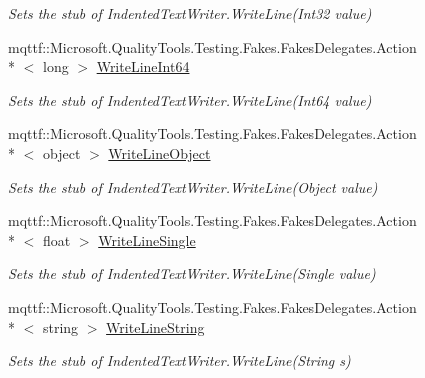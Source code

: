 \begin{DoxyCompactItemize}
\begin{DoxyCompactList}\small\item\em Sets the stub of Indented\-Text\-Writer.\-Write\-Line(\-Int32 value)\end{DoxyCompactList}\item 
mqttf\-::\-Microsoft.\-Quality\-Tools.\-Testing.\-Fakes.\-Fakes\-Delegates.\-Action\\*
$<$ long $>$ \hyperlink{class_system_1_1_code_dom_1_1_compiler_1_1_fakes_1_1_stub_indented_text_writer_a657b45c192824363dae987dbcbf330af}{Write\-Line\-Int64}
\begin{DoxyCompactList}\small\item\em Sets the stub of Indented\-Text\-Writer.\-Write\-Line(\-Int64 value)\end{DoxyCompactList}\item 
mqttf\-::\-Microsoft.\-Quality\-Tools.\-Testing.\-Fakes.\-Fakes\-Delegates.\-Action\\*
$<$ object $>$ \hyperlink{class_system_1_1_code_dom_1_1_compiler_1_1_fakes_1_1_stub_indented_text_writer_acd9414bf46444087c28ae18b21f4f0a5}{Write\-Line\-Object}
\begin{DoxyCompactList}\small\item\em Sets the stub of Indented\-Text\-Writer.\-Write\-Line(\-Object value)\end{DoxyCompactList}\item 
mqttf\-::\-Microsoft.\-Quality\-Tools.\-Testing.\-Fakes.\-Fakes\-Delegates.\-Action\\*
$<$ float $>$ \hyperlink{class_system_1_1_code_dom_1_1_compiler_1_1_fakes_1_1_stub_indented_text_writer_ab3e498070e8dec2b3e3d7588771d14bd}{Write\-Line\-Single}
\begin{DoxyCompactList}\small\item\em Sets the stub of Indented\-Text\-Writer.\-Write\-Line(\-Single value)\end{DoxyCompactList}\item 
mqttf\-::\-Microsoft.\-Quality\-Tools.\-Testing.\-Fakes.\-Fakes\-Delegates.\-Action\\*
$<$ string $>$ \hyperlink{class_system_1_1_code_dom_1_1_compiler_1_1_fakes_1_1_stub_indented_text_writer_a6e4a5f428065000325bc9a83d31ae6e7}{Write\-Line\-String}
\begin{DoxyCompactList}\small\item\em Sets the stub of Indented\-Text\-Writer.\-Write\-Line(\-String s)\end{DoxyCompactList}\item 

\end{DoxyCompactItemize}
